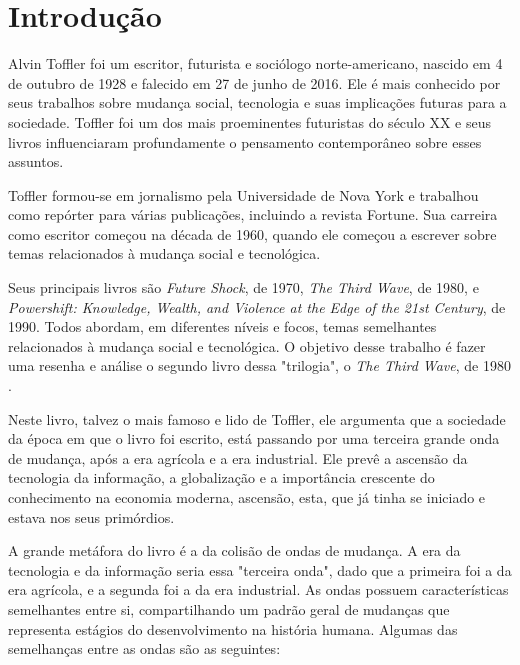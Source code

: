 \section{
	Introdução
}

\setlength{\parindent}{4em}
\setlength{\parskip}{0.5em}
\renewcommand{\baselinestretch}{1}

Alvin Toffler foi um escritor, futurista e sociólogo norte-americano, nascido em 4 de outubro de 1928 e falecido em 27 de junho de 2016. Ele é mais conhecido por seus trabalhos sobre mudança social, tecnologia e suas implicações futuras para a sociedade. Toffler foi um dos mais proeminentes futuristas do século XX e seus livros influenciaram profundamente o pensamento contemporâneo sobre esses assuntos.

Toffler formou-se em jornalismo pela Universidade de Nova York e trabalhou como repórter para várias publicações, incluindo a revista Fortune. Sua carreira como escritor começou na década de 1960, quando ele começou a escrever sobre temas relacionados à mudança social e tecnológica.

Seus principais livros são \textit{Future Shock}, de 1970, \textit{The Third Wave}, de 1980, e \textit{Powershift: Knowledge, Wealth, and Violence at the Edge of the 21st Century}, de 1990. Todos abordam, em diferentes níveis e focos, temas semelhantes relacionados à mudança social e tecnológica. O objetivo desse trabalho é fazer uma resenha e análise o segundo livro dessa "trilogia", o \textit{The Third Wave}, de 1980 \cite{Toffler1980}.

Neste livro, talvez o mais famoso e lido de Toffler, ele argumenta que a sociedade da época em que o livro foi escrito, está passando por uma terceira grande onda de mudança, após a era agrícola e a era industrial. Ele prevê a ascensão da tecnologia da informação, a globalização e a importância crescente do conhecimento na economia moderna, ascensão, esta, que já tinha se iniciado e estava nos seus primórdios. 

A grande metáfora do livro é a da colisão de ondas de mudança. A era da tecnologia e da informação seria essa "terceira onda", dado que a primeira foi a da era agrícola, e a segunda foi a da era industrial. As ondas possuem características semelhantes entre si, compartilhando um padrão geral de mudanças que representa estágios do desenvolvimento na história humana. Algumas das semelhanças entre as ondas são as seguintes:

